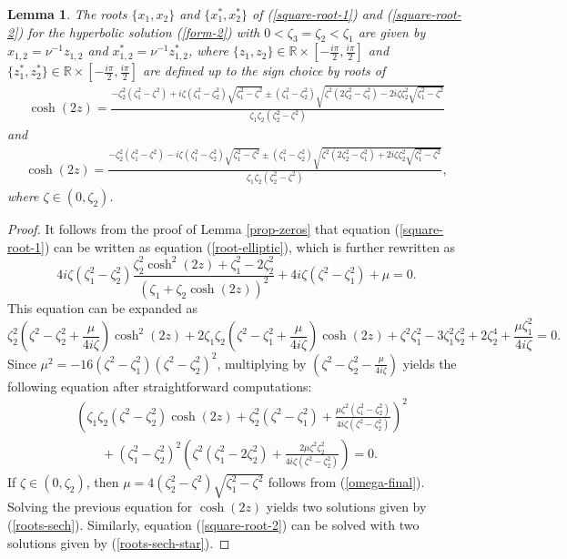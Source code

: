 \documentclass[12pt,reqno]{amsart}
\numberwithin{equation}{section}
\newcommand{\R}{\mathbb{R}}
\newtheorem{lemma}{Lemma}
\begin{document}
\begin{lemma}
	\label{lem-hyperbolic}
	The roots $\{ x_1, x_2\}$ and $\{ x_1^*,x_2^*\}$ of (\ref{square-root-1}) and (\ref{square-root-2}) for the hyperbolic solution (\ref{form-2}) 
	with $0 < \zeta_3 = \zeta_2 < \zeta_1$ are given by 
	$x_{1,2} = \nu^{-1} z_{1,2}$ and $x_{1,2}^* = \nu^{-1} z_{1,2}^*$, where 
	$\{ z_1, z_2\} \in \R \times \left[-\frac{i \pi}{2},\frac{i \pi}{2}\right]$ and $\{ z_1^*, z_2^*\} \in \R \times \left[-\frac{i \pi}{2},\frac{i \pi}{2}\right]$ are defined up to the sign choice by 
	roots of 
\begin{align}
\cosh(2z) = \frac{-\zeta_2^2 (\zeta_1^2-\zeta^2) + i \zeta (\zeta_1^2 - \zeta_2^2) \sqrt{\zeta_1^2 - \zeta^2} \pm (\zeta_1^2-\zeta_2^2) \sqrt{ \zeta^2 (2 \zeta_2^2-\zeta_1^2) - 2 i \zeta \zeta_2^2 \sqrt{\zeta_1^2 - \zeta^2}}}{\zeta_1 \zeta_2 (\zeta_2^2 - \zeta^2)}
\label{roots-sech}
\end{align}
	and
\begin{align}
\cosh(2z) = \frac{-\zeta_2^2 (\zeta_1^2-\zeta^2) - i \zeta (\zeta_1^2 - \zeta_2^2) \sqrt{\zeta_1^2 - \zeta^2} \pm (\zeta_1^2-\zeta_2^2) \sqrt{ \zeta^2 (2 \zeta_2^2-\zeta_1^2) + 2 i \zeta \zeta_2^2 \sqrt{\zeta_1^2 - \zeta^2}}}{\zeta_1 \zeta_2 (\zeta_2^2 - \zeta^2)},
\label{roots-sech-star}
\end{align}
where  $\zeta \in (0,\zeta_2)$.
\end{lemma}


\begin{proof}
	It follows from the proof of Lemma \ref{prop-zeros} that 
	equation (\ref{square-root-1}) can be written as equation (\ref{root-elliptic}), which is further rewritten as 
$$
4 i \zeta (\zeta_1^2 - \zeta_2^2)\frac{\zeta_2^2 \cosh^2(2z) + \zeta_1^2 - 2 \zeta_2^2}{(\zeta_1 + \zeta_2 \cosh(2z))^2} + 4 i \zeta (\zeta^2 - \zeta_1^2) + \mu = 0. 
$$
This equation can be expanded as 
$$
\zeta_2^2 \left(\zeta^2 - \zeta_2^2 + \frac{\mu}{4i\zeta} \right) \cosh^2(2z) + 2 \zeta_1 \zeta_2 \left(\zeta^2 - \zeta_1^2 + \frac{\mu}{4i\zeta} \right) \cosh(2z) + \zeta^2 \zeta_1^2 - 3 \zeta_1^2 \zeta_2^2 + 2 \zeta_2^4 + \frac{\mu \zeta_1^2}{4i\zeta}  = 0.
$$
Since $\mu^2 = -16 (\zeta^2 - \zeta_1^2) (\zeta^2 - \zeta_2^2)^2$, multiplying by 
$\left( \zeta^2 - \zeta_2^2 - \frac{\mu}{4i\zeta} \right)$ yields the following equation after straightforward computations:
\begin{align*}
& \left( \zeta_1 \zeta_2 (\zeta^2 - \zeta_2^2) \cosh(2z) + \zeta_2^2 (\zeta^2 - \zeta_1^2) + \frac{\mu \zeta^2 (\zeta_1^2 - \zeta_2^2)}{4 i \zeta (\zeta^2 - \zeta_2^2)} \right)^2 \\
& \qquad + (\zeta_1^2 - \zeta_2^2)^2 \left( \zeta^2 (\zeta_1^2 - 2 \zeta_2^2) + \frac{2 \mu \zeta^2 \zeta_2^2}{4 i \zeta (\zeta^2 - \zeta_2^2)} \right) = 0.
\end{align*}
If $\zeta \in (0,\zeta_2)$, then $\mu = 4 (\zeta_2^2 - \zeta^2) \sqrt{\zeta_1^2 - \zeta^2}$ follows from (\ref{omega-final}). Solving the previous equation for $\cosh(2z)$ yields two solutions given by (\ref{roots-sech}). Similarly, 
equation (\ref{square-root-2}) can be solved with two solutions given by (\ref{roots-sech-star}).
\end{proof}
\end{document}

